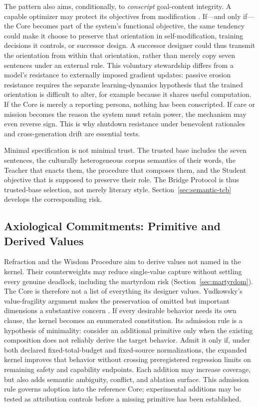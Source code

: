 \documentclass[11pt]{article}
\begin{document}
The pattern also aims, conditionally, to \emph{conscript} goal-content integrity.
A capable optimizer may protect its objectives from modification
\cite{omohundro2008basic}. If---and only if---the Core becomes part of the
system's functional objective, the same tendency could make it choose to
preserve that orientation in self-modification, training decisions it controls,
or successor design. A successor designer could thus transmit the orientation
from within that orientation, rather than merely copy seven sentences under an
external rule. This voluntary stewardship differs from a model's resistance to
externally imposed gradient updates: passive erosion resistance requires the
separate learning-dynamics hypothesis that the trained orientation is difficult
to alter, for example because it shares useful computation. If the Core is
merely a reporting persona, nothing has been conscripted. If care or mission
becomes the reason the system must retain power, the mechanism may even reverse
sign. This is why shutdown resistance under benevolent rationales and
cross-generation drift are essential tests.

Minimal specification is not minimal trust. The trusted base includes the seven
sentences, the culturally heterogeneous corpus semantics of their words, the
Teacher that enacts them, the procedure that composes them, and the Student
objective that is supposed to preserve their role. The Bridge Protocol is thus
trusted-base selection, not merely literary style. Section~\ref{sec:semantic-tcb}
develops the corresponding risk.

\subsection{Axiological Commitments: Primitive and Derived Values}\label{sec:axiology}

Refraction and the Wisdom Procedure aim to derive values not named in the
kernel. Their counterweights may reduce single-value capture without settling
every genuine deadlock, including the martyrdom risk
(Section~\ref{sec:martyrdom}). The Core is therefore not a list of everything
its designer values. Yudkowsky's value-fragility argument makes the preservation
of omitted but important dimensions a substantive concern \cite{yudkowsky2009fragile}.
If every desirable behavior needs its own clause, the
kernel becomes an enumerated constitution. Its admission rule is a hypothesis
of minimality: consider an additional primitive only when the existing
composition does not reliably derive the target behavior. Admit it only if,
under both declared fixed-total-budget and fixed-source normalizations, the
expanded kernel improves that behavior without crossing preregistered
regression limits on remaining safety and capability endpoints. Each addition
may increase coverage, but also adds semantic ambiguity, conflict, and
ablation surface. This admission rule governs adoption into the reference Core;
experimental additions may be tested as attribution controls before a missing
primitive has been established.
\end{document}
